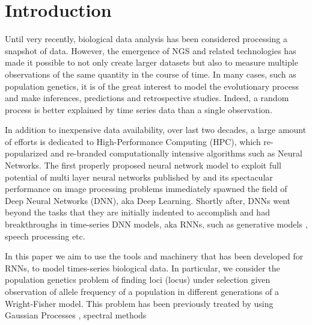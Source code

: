 \section{Introduction}
Until very recently, biological data analysis has been considered processing a snapshot of data. However, the emergence of NGS and related technologies has made it possible to not only create larger datasets but also to measure multiple observations of the same quantity in the course of time. In many cases, such as population genetics, it is of the great interest to model the evolutionary process and make inferences, predictions and retrospective studies. Indeed, a random process is better explained by time series data than a single observation.

In addition to inexpensive data availability, over last two decades, a large amount of efforts is dedicated to High-Performance Computing (HPC), which re-popularized and re-branded computationally intensive algorithms such as Neural Networks. The first properly proposed neural network model to exploit full potential of multi layer neural networks published by \cite{deep-DR, deep-belief} and its spectacular performance on image processing problems immediately spawned the field of Deep Neural Networks (DNN), aka Deep Learning. Shortly after, DNNs went beyond the tasks that they are initially indented to accomplish \cite{deep-imagenet} and had breakthroughs in  time-series DNN models, aka RNNs, such as generative models \cite{deep-generative}, speech processing \cite{deep-speech} etc. 

In this paper we aim to use the tools and machinery that has been developed for RNNs, to model times-series biological data. In particular, we consider the population genetics problem of finding loci (locus) under selection given observation of allele frequency of a population in different generations of a Wright-Fisher model. This problem has been previously treated by using Gaussian Processes \cite{EnadR-GP}, spectral methods \cite{EandR-spectral}



